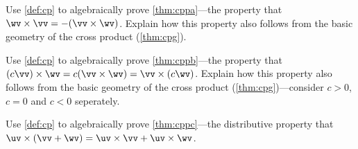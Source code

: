 \begin{exercise} \label{ex:cppa} 
Use \autoref{def:cp} to algebraically prove \autoref{thm:cppa}---the property that \(\wv\times\vv=-(\vv\times\wv)\).
Explain how this property also follows from the basic geometry of the cross product (\autoref{thm:cpg}).
\end{exercise}



\begin{exercise} \label{ex:cppb} 
Use \autoref{def:cp} to algebraically prove \autoref{thm:cppb}---the property that \((c\vv)\times\wv=c(\vv\times\wv)=\vv\times(c\wv)\).
Explain how this property also follows from the basic geometry of the cross product (\autoref{thm:cpg})---consider \(c>0\), \(c=0\) and \(c<0\) seperately.
\end{exercise}



\begin{exercise} \label{ex:cppc} 
Use \autoref{def:cp} to algebraically prove \autoref{thm:cppc}---the distributive property that \(\uv\times(\vv+\wv)=\uv\times\vv+\uv\times\wv\).
\end{exercise}





